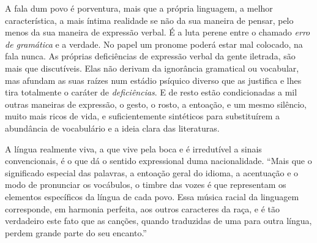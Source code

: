 A fala dum povo é porventura, mais que a própria linguagem, a melhor
característica, a mais íntima realidade se não da sua maneira de pensar,
pelo menos da sua maneira de expressão verbal. É a luta perene entre o
chamado \textit{erro de gramática} e a verdade. No papel um pronome poderá
estar mal colocado, na fala nunca. As próprias deficiências de expressão
verbal da gente iletrada, são mais que discutíveis. Elas não derivam da
ignorância gramatical ou vocabular, mas afundam as suas raízes num
estádio psíquico diverso que as justifica e lhes tira totalmente o
caráter de \textit{deficiências}. E de resto estão condicionadas a mil outras
maneiras de expressão, o gesto, o rosto, a entoação, e um mesmo
silêncio, muito mais ricos de vida, e suficientemente sintéticos para
substituírem a abundância de vocabulário e a ideia clara das
literaturas.

A língua realmente viva, a que vive pela boca e é irredutível a sinais
convencionais, é o que dá o sentido expressional duma nacionalidade.
``Mais que o significado especial das palavras, a entoação geral do
idioma, a acentuação e o modo de pronunciar os vocábulos, o timbre das
vozes é que representam os elementos específicos da língua de cada povo.
Essa música racial da linguagem corresponde, em harmonia perfeita, aos
outros caracteres da raça, e é tão verdadeiro este fato que as canções,
quando traduzidas de uma para outra língua, perdem grande parte do seu
encanto.''

